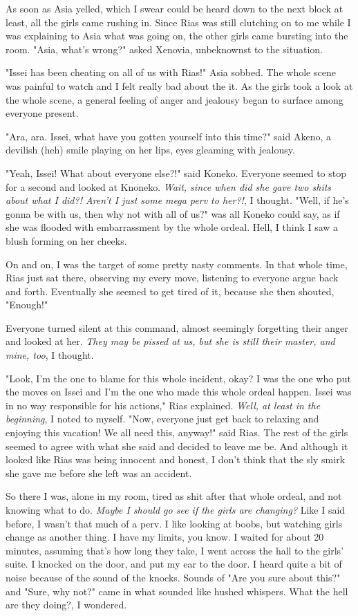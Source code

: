 \documentclass{article}
\begin{document}
As soon as Asia yelled, which I swear could be heard down to the next block at least, all the girls came rushing in. Since Rias was still clutching on to me while I was explaining to Asia what was going on, the other girls came bursting into the room. "Asia, what's wrong?" asked Xenovia, unbeknownst to the situation.

"Issei has been cheating on all of us with Rias!" Asia sobbed. The whole scene was painful to watch and I felt really bad about the it. As the girls took a look at the whole scene, a general feeling of anger and jealousy began to surface among everyone present.

"Ara, ara. Issei, what have you gotten yourself into this time?" said Akeno, a devilish (heh) smile playing on her lips, eyes gleaming with jealousy.

"Yeah, Issei! What about everyone else?!" said Koneko. Everyone seemed to stop for a second and looked at Knoneko. \emph{Wait, since when did she gave two shits about what I did?! Aren't I just some mega perv to her?!}, I thought. "Well, if he's gonna be with us, then why not with all of us?" was all Koneko could say, as if she was flooded with embarrassment by the whole ordeal. Hell, I think I saw a blush forming on her cheeks.

On and on, I was the target of some pretty nasty comments. In that whole time, Rias just sat there, observing my every move, listening to everyone argue back and forth. Eventually she seemed to get tired of it, because she then shouted, "Enough!"

Everyone turned silent at this command, almost seemingly forgetting their anger and looked at her. \emph{They may be pissed at us, but she is still their master, and mine, too}, I thought. 

"Look, I'm the one to blame for this whole incident, okay? I was the one who put the moves on Issei and I'm the one who made this whole ordeal happen. Issei was in no way responsible for his actions," Rias explained. \emph{Well, at least in the beginning}, I noted to myself. "Now, everyone just get back to relaxing and enjoying this vacation! We all need this, anyway!" said Rias. The rest of the girls seemed to agree with what she said and decided to leave me be. And although it looked like Rias was being innocent and honest, I don't think that the sly smirk she gave me before she left was an accident.

So there I was, alone in my room, tired as shit after that whole ordeal, and not knowing what to do. \emph{Maybe I should go see if the girls are changing?} Like I said before, I wasn't that much of a perv. I like looking at boobs, but watching girls change as another thing. I have my limits, you know. I waited for about 20 minutes, assuming that's how long they take, I went across the hall to the girls' suite. I knocked on the door, and put my ear to the door. I heard quite a bit of noise because of the sound of the knocks. Sounds of "Are you sure about this?" and "Sure, why not?" came in what sounded like hushed whispers. What the hell are they doing?, I wondered.
\end{document}
